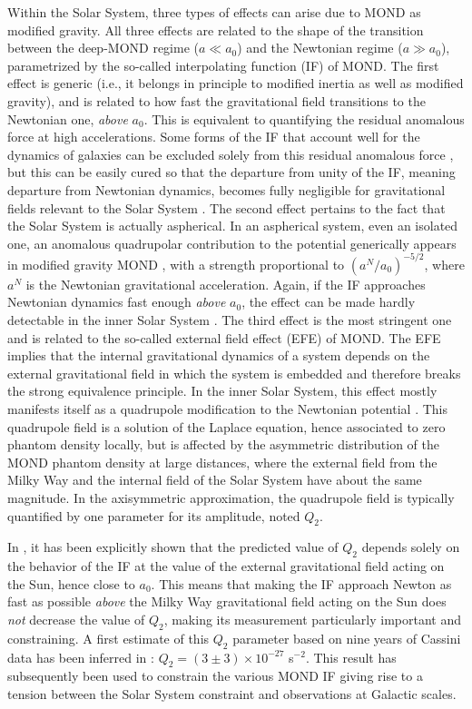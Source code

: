 \documentclass[reprint,nofootinbib,prd,aps]{revtex4-2}
\begin{document}
Within the Solar System, three types of effects can arise due to MOND as modified gravity. All three effects are related to the shape of the transition between the deep-MOND regime ($a \ll a_0$) and the Newtonian regime ($a \gg a_0$), parametrized by the so-called interpolating function (IF) of MOND. The first effect is generic (i.e., it belongs in principle to modified inertia as well as modified gravity), and is related to how fast the gravitational field transitions to the Newtonian one, \emph{above} $a_0$. This is equivalent to quantifying the residual anomalous force at high accelerations. Some forms of the IF that account well for the dynamics of galaxies can be excluded solely from this residual anomalous force  \cite{sereno:2006vn}, but this can be easily cured so that the departure from unity of the IF, meaning departure from Newtonian dynamics, becomes fully negligible for gravitational fields relevant to the Solar System \citep[see, e.g.,][]{FamaeyMcG}. The second effect pertains to the fact that the Solar System is actually aspherical. In an aspherical system, even an  isolated one, an anomalous quadrupolar contribution to the potential generically appears in modified gravity MOND \citep{Milgrom2012}, with a strength proportional to $(a^N/a_0)^{-5/2}$, where $a^N$ is the Newtonian gravitational acceleration. Again, if the IF approaches Newtonian dynamics fast enough \emph{above} $a_0$, the effect can be made hardly detectable in the inner Solar System \cite{Milgrom2012,iorio:2013ty}. The third effect is the most stringent one and is related to the so-called external field effect (EFE) of MOND. The EFE implies that the internal gravitational dynamics of a system depends on the external gravitational field in which the system is embedded \cite{bekenstein:1984kx} and therefore breaks the strong equivalence principle. In the inner Solar System, this effect mostly manifests itself as a quadrupole modification to the Newtonian potential \cite{milgrom:2009vn}. This quadrupole field is a solution of the Laplace equation, hence associated to zero phantom density locally, but is affected by the asymmetric distribution of the MOND phantom density at large distances, where the external field from the Milky Way and the internal field of the Solar System have about the same magnitude. In the axisymmetric approximation, the quadrupole field is typically quantified by one parameter for its amplitude, noted $Q_2$.

In \cite{Desmond_Cassini}, it has been explicitly shown that the predicted value of $Q_2$ depends solely on the behavior of the IF at the value of the external gravitational field acting on the Sun, hence close to $a_0$. This means that making the IF approach Newton as fast as possible \emph{above} the Milky Way gravitational field acting on the Sun does \emph{not} decrease the value of $Q_2$, making its measurement particularly important and constraining. A first estimate of this $Q_2$ parameter based on nine years of Cassini data has been inferred in \cite{hees_2014}: $Q_2 = \left(3\pm 3\right)\times 10^{-27}$ s$^{-2}$. This result has subsequently been used to constrain the various MOND IF \cite{hees:2016mi,Desmond_Cassini} giving rise to a tension between the Solar System constraint and observations at Galactic scales. 
\end{document}
